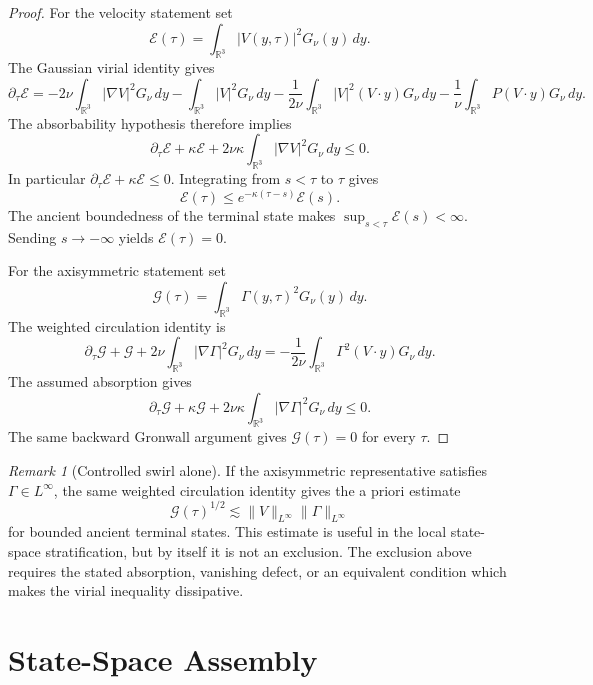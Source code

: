 \documentclass[11pt]{amsart}
\theoremstyle{plain}
\theoremstyle{definition}
\theoremstyle{remark}
\newtheorem{remark}[theorem]{Remark}
\begin{document}
\begin{proof}
For the velocity statement set
\[
  \mathcal E(\tau)=\int_{\mathbb R^3}|V(y,\tau)|^2G_\nu(y)\,dy .
\]
The Gaussian virial identity gives
\[
  \partial_\tau\mathcal E
  =
  -2\nu\int_{\mathbb R^3}|\nabla V|^2G_\nu\,dy
  -\int_{\mathbb R^3}|V|^2G_\nu\,dy
  -\frac{1}{2\nu}\int_{\mathbb R^3}|V|^2(V\cdot y)G_\nu\,dy
  -\frac1\nu\int_{\mathbb R^3}P(V\cdot y)G_\nu\,dy .
\]
The absorbability hypothesis therefore implies
\[
  \partial_\tau\mathcal E
  +\kappa\mathcal E
  +2\nu\kappa\int_{\mathbb R^3}|\nabla V|^2G_\nu\,dy
  \le0 .
\]
In particular \(\partial_\tau\mathcal E+\kappa\mathcal E\le0\).  Integrating
from \(s<\tau\) to \(\tau\) gives
\[
  \mathcal E(\tau)\le e^{-\kappa(\tau-s)}\mathcal E(s).
\]
The ancient boundedness of the terminal state makes \(\sup_{s<\tau}\mathcal
E(s)<\infty\).  Sending \(s\to-\infty\) yields \(\mathcal E(\tau)=0\).

For the axisymmetric statement set
\[
  \mathcal G(\tau)=\int_{\mathbb R^3}\Gamma(y,\tau)^2G_\nu(y)\,dy .
\]
The weighted circulation identity is
\[
  \partial_\tau\mathcal G
  +\mathcal G
  +2\nu\int_{\mathbb R^3}|\nabla\Gamma|^2G_\nu\,dy
  =
  -\frac{1}{2\nu}\int_{\mathbb R^3}\Gamma^2(V\cdot y)G_\nu\,dy .
\]
The assumed absorption gives
\[
  \partial_\tau\mathcal G+\kappa\mathcal G
  +2\nu\kappa\int_{\mathbb R^3}|\nabla\Gamma|^2G_\nu\,dy
  \le0 .
\]
The same backward Gronwall argument gives \(\mathcal G(\tau)=0\) for every
\(\tau\).
\end{proof}

\begin{remark}[Controlled swirl alone]
\label{rem:controlled-swirl}
If the axisymmetric representative satisfies \(\Gamma\in L^\infty\), the same
weighted circulation identity gives the a priori estimate
\[
  \mathcal G(\tau)^{1/2}
  \lesssim
  \|V\|_{L^\infty}\|\Gamma\|_{L^\infty}
\]
for bounded ancient terminal states.  This estimate is useful in the local
state-space stratification, but by itself it is not an exclusion.  The exclusion
above requires the stated absorption, vanishing defect, or an equivalent
condition which makes the virial inequality dissipative.
\end{remark}

\section{State-Space Assembly}
\end{document}
